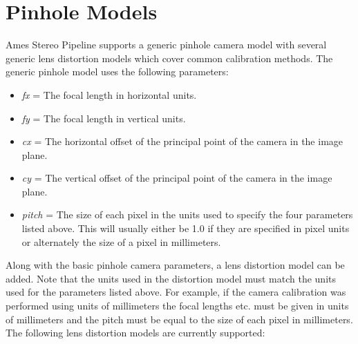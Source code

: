 \chapter{Pinhole Models}
\label{chapter:pinholemodels}


Ames Stereo Pipeline supports a generic pinhole camera model with
several generic lens distortion models which cover common 
calibration methods.  The generic pinhole model uses the following
parameters:   

\begin{itemize}{}
\item  \textit{fx} = The focal length in horizontal units.
\item  \textit{fy} = The focal length in vertical units.
\item  \textit{cx} = The horizontal offset of the principal 
point of the camera in the image plane.
\item  \textit{cy} = The vertical offset of the principal 
point of the camera in the image plane.
\item  \textit{pitch} = The size of each pixel in the units used to specify
the four parameters listed above.  This will usually either be 1.0 if they
are specified in pixel units or alternately the size of a pixel in millimeters.
\end{itemize}

Along with the basic pinhole camera parameters, a lens distortion model
can be added.  Note that the units used in the distortion model must
match the units used for the parameters listed above.  For example, if the
camera calibration was performed using units of millimeters the focal lengths etc. must be given in
units of millimeters and the pitch must be equal to the size of each pixel in millimeters.
The following lens distortion models are currently supported:


